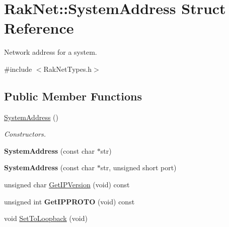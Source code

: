 \hypertarget{struct_rak_net_1_1_system_address}{\section{Rak\-Net\-:\-:System\-Address Struct Reference}
\label{struct_rak_net_1_1_system_address}
}


Network address for a system.  




{\ttfamily \#include $<$Rak\-Net\-Types.\-h$>$}

\subsection*{Public Member Functions}
\begin{DoxyCompactItemize}
\item 
\hypertarget{struct_rak_net_1_1_system_address_aa79eae01137c5bd6fda06a6208784f7a}{\hyperlink{struct_rak_net_1_1_system_address_aa79eae01137c5bd6fda06a6208784f7a}{System\-Address} ()}\label{struct_rak_net_1_1_system_address_aa79eae01137c5bd6fda06a6208784f7a}

\begin{DoxyCompactList}\small\item\em Constructors. \end{DoxyCompactList}\item 
\hypertarget{struct_rak_net_1_1_system_address_abd1ae4b168955dc9f0e264121470667d}{{\bfseries System\-Address} (const char $\ast$str)}\label{struct_rak_net_1_1_system_address_abd1ae4b168955dc9f0e264121470667d}

\item 
\hypertarget{struct_rak_net_1_1_system_address_ac11048d97c9f0de0e3d2f1b7546ca9e8}{{\bfseries System\-Address} (const char $\ast$str, unsigned short port)}\label{struct_rak_net_1_1_system_address_ac11048d97c9f0de0e3d2f1b7546ca9e8}

\item 
unsigned char \hyperlink{struct_rak_net_1_1_system_address_a98445edfff09041744e3951e6acc3103}{Get\-I\-P\-Version} (void) const 
\item 
\hypertarget{struct_rak_net_1_1_system_address_abf2bd11b4dcf72e5aee753a3c15de6f1}{unsigned int {\bfseries Get\-I\-P\-P\-R\-O\-T\-O} (void) const }\label{struct_rak_net_1_1_system_address_abf2bd11b4dcf72e5aee753a3c15de6f1}

\item 
\hypertarget{struct_rak_net_1_1_system_address_a53d3920059f3790320d360ccf2a61d14}{void \hyperlink{struct_rak_net_1_1_system_address_a53d3920059f3790320d360ccf2a61d14}{Set\-To\-Loopback} (void)}\label{struct_rak_net_1_1_system_address_a53d3920059f3790320d360ccf2a61d14}


\end{DoxyCompactItemize}
